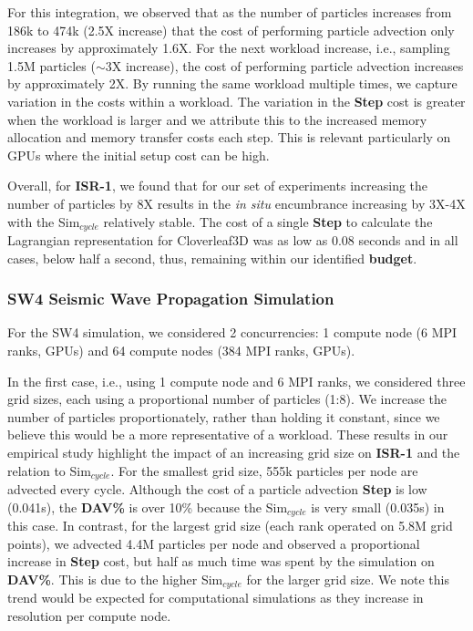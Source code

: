 For this integration, we observed that as the number of particles increases from 186k to 474k (2.5X increase) that the cost of performing particle advection only increases by approximately 1.6X. 
%
For the next workload increase, i.e., sampling 1.5M particles ($\sim$3X increase), the cost of performing particle advection increases by approximately 2X.
%
By running the same workload multiple times, we capture variation in the costs within a workload.
%
The variation in the \textbf{Step} cost is greater when the workload is larger and we attribute this to the increased memory allocation and memory transfer costs each step.
%
This is relevant particularly on GPUs where the initial setup cost can be high.
%
%

Overall, for \textbf{ISR-1}, we found that for our set of experiments increasing the number of particles by 8X results in the \textit{in situ} encumbrance increasing by 3X-4X with the Sim$_{cycle}$ relatively stable.
%
The cost of a single \textbf{Step} to calculate the Lagrangian representation for Cloverleaf3D was as low as 0.08 seconds and in all cases, below half a second, thus, remaining within our identified \textbf{budget}.

\subsubsection{SW4 Seismic Wave Propagation Simulation}
For the SW4 simulation, we considered 2 concurrencies: 1 compute node (6 MPI ranks, GPUs) and 64 compute nodes (384 MPI ranks, GPUs).
%

In the first case, i.e., using 1 compute node and 6 MPI ranks, we considered three grid sizes, each using a proportional number of particles (1:8).
%
We increase the number of particles proportionately, rather than holding it constant, since we believe this would be a more representative of a workload.
%
These results in our empirical study highlight the impact of an increasing grid size on \textbf{ISR-1} and the relation to Sim$_{cycle}$.
%
For the smallest grid size, 555k particles per node are advected every cycle.
%
Although the cost of a particle advection \textbf{Step} is low (0.041s), the \textbf{DAV\%} is over 10\% because the Sim$_{cycle}$ is very small (0.035s) in this case.
%
In contrast, for the largest grid size (each rank operated on 5.8M grid points), we advected 4.4M particles per node and observed a proportional increase in \textbf{Step} cost, but half as much time was spent by the simulation on \textbf{DAV\%}.
%
This is due to the higher Sim$_{cycle}$ for the larger grid size.
%
We note this trend would be expected for computational simulations as they increase in resolution per compute node.
%

